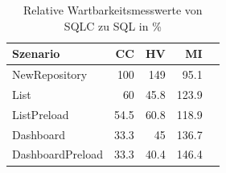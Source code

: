 \begin{table}[ht]
\centering
\caption{Relative Wartbarkeitsmesswerte von SQLC zu SQL in \%}
\begin{tabular}{lrrrr}
\toprule
Szenario & CC & HV & MI \\
\midrule
	NewRepository &  100 & \cellcolor{red!30}  149 & \cellcolor{red!12}  95.1 \\
	List & \cellcolor{green!26}  60 & \cellcolor{green!30}  45.8 & \cellcolor{green!20}  123.9 \\
	ListPreload & \cellcolor{green!28}  54.5 & \cellcolor{green!26}  60.8 & \cellcolor{green!18}  118.9 \\
	Dashboard & \cellcolor{green!30}  33.3 & \cellcolor{green!30}  45 & \cellcolor{green!25}  136.7 \\
	DashboardPreload & \cellcolor{green!30}  33.3 & \cellcolor{green!30}  40.4 & \cellcolor{green!29}  146.4 \\
\bottomrule
\end{tabular}
\label{tab:wartbarkeit_relativ_sqlc}
\end{table}
	